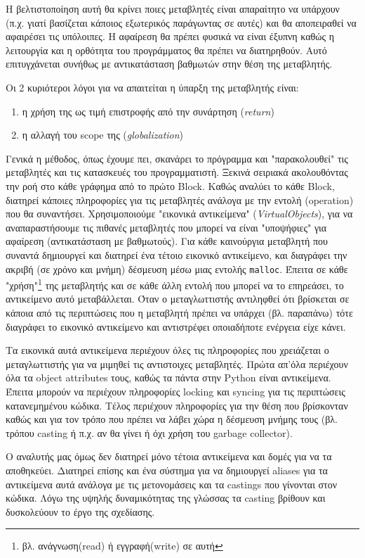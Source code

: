 Η βελτιστοποίηση αυτή θα κρίνει ποιες μεταβλητές είναι απαραίτητο να
υπάρχουν (π.χ. γιατί βασίζεται κάποιος εξωτερικός παράγωντας σε αυτές) και θα
αποπειραθεί να αφαιρέσει τις υπόλοιπες. Η αφαίρεση θα πρέπει φυσικά να είναι
έξυπνη καθώς η λειτουργία και η ορθότητα του προγράμματος θα πρέπει να
διατηρηθούν. Αυτό επιτυγχάνεται συνήθως με αντικατάσταση βαθμωτών στην θέση της
μεταβλητής.

Οι 2 κυριότεροι λόγοι για να απαιτείται η ύπαρξη της μεταβλητής είναι:
\begin{enumerate}
\item η χρήση της ως τιμή επιστροφής από την συνάρτηση (\textit{return})
\item η αλλαγή του scope της (\textit{globalization})
\end{enumerate} 

Γενικά η μέθοδος, όπως έχουμε πει, σκανάρει το πρόγραμμα και "παρακολουθεί" τις
μεταβλητές και τις κατασκευές του προγραμματιστή. Ξεκινά σειριακά ακολουθόντας
την ροή στο κάθε γράφημα από το πρώτο Block. Καθώς αναλύει το κάθε Block,
διατηρεί κάποιες πληροφορίες για τις μεταβλητές ανάλογα με την εντολή
(operation) που θα συναντήσει. Χρησιμοποιούμε  "εικονικά αντικείμενα"
(\textit{VirtualObjects}), για να αναπαραστήσουμε τις πιθανές μεταβλητές που
μπορεί να είναι "υποψήφιες" για αφαίρεση (αντικατάσταση με βαθμωτούς). Για κάθε
καινούργια μεταβλητή που συναντά δημιουργεί και διατηρεί ένα τέτοιο εικονικό
αντικείμενο, και διαγράφει την ακριβή (σε χρόνο και μνήμη) δέσμευση μέσω μιας
εντολής \texttt{malloc}. Έπειτα σε κάθε "χρήση"\footnote{βλ. ανάγνωση(read) ή
εγγραφή(write) σε αυτή} της μεταβλητής και σε κάθε άλλη εντολή που μπορεί να το
επηρεάσει, το αντικείμενο αυτό μεταβάλλεται. Όταν ο μεταγλωττιστής αντιληφθεί
ότι βρίσκεται σε κάποια από τις περιπτώσεις που η μεταβλητή πρέπει να υπάρχει
(βλ. παραπάνω) τότε διαγράφει το εικονικό αντικείμενο και αντιστρέφει
οποιαδήποτε ενέργεια είχε κάνει.

Τα εικονικά αυτά αντικείμενα περιέχουν όλες τις πληροφορίες που χρειάζεται ο
μεταγλωττιστής για να μιμηθεί τις αντιστοιχες μεταβλητές. Πρώτα απ'όλα περιέχουν
όλα τα object attributes τους, καθώς τα πάντα στην Python είναι αντικείμενα.
Έπειτα μπορούν να περιέχουν πληροφορίες locking και syncing για τις περιπτώσεις
κατανεμημένου κώδικα. Τέλος περιέχουν πληροφορίες για την θέση που βρίσκονταν
καθώς και για τον τρόπο που πρέπει να λάβει χώρα η δέσμευση μνήμης τους (βλ.
τρόπου casting ή π.χ. αν θα γίνει ή όχι χρήση του garbage collector).

Ο αναλυτής μας όμως δεν διατηρεί μόνο τέτοια αντικείμενα και δομές για να τα
αποθηκεύει. Διατηρεί επίσης και ένα σύστημα για να δημιουργεί aliases για τα
αντικείμενα αυτά ανάλογα με τις μετονομάσεις και τα castings που γίνονται στον
κώδικα. Λόγω της υψηλής δυναμικότητας της γλώσσας τα casting βρίθουν και
δυσκολεύουν το έργο της σχεδίασης.

